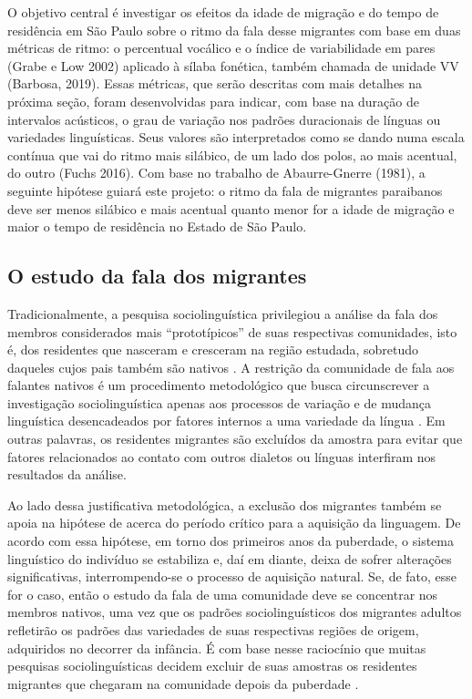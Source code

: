 \documentclass[
			a4paper,		%
			12pt,			%
			oneside,
			]{article}		%
\begin{document}
O objetivo central é investigar os efeitos da idade de migração e do tempo de 
residência em São Paulo sobre o ritmo da fala desse migrantes com base em duas métricas 
de ritmo: o percentual vocálico \citep{Ramus.etal1999} e o índice de variabilidade em 
pares (Grabe e Low 2002) aplicado à sílaba fonética, também chamada de unidade VV 
(Barbosa, 
2019). Essas métricas, que serão descritas com mais detalhes na próxima seção, foram 
desenvolvidas para indicar, com base na duração de intervalos acústicos, o grau de 
variação nos padrões duracionais de línguas ou variedades linguísticas. Seus valores são 
interpretados como se dando numa escala contínua que vai do ritmo mais silábico, de um 
lado dos polos, ao 	mais acentual, do outro (Fuchs 2016). Com base no trabalho de 
Abaurre-Gnerre (1981), a seguinte hipótese guiará este projeto: o ritmo da fala de 
migrantes paraibanos deve ser menos silábico e mais acentual quanto menor for a idade de 
migração e maior o tempo de residência no Estado de São Paulo.
	
		\subsection{O estudo da fala dos migrantes}
		
Tradicionalmente, a pesquisa sociolinguística privilegiou a análise da fala dos membros 
considerados mais “prototípicos” de suas respectivas comunidades, isto é, dos residentes 
que nasceram e cresceram na região estudada, sobretudo daqueles cujos pais também são 
nativos \citep{Britain2018, Oushiro2016, Milroy2002, Kerswill1993}. A restrição da 
comunidade de fala aos falantes nativos é um procedimento 
metodológico que busca circunscrever a investigação sociolinguística apenas aos processos 
de variação e de mudança linguística desencadeados por fatores internos a uma variedade 
da língua \citep[][p. 20]{Milroy2002, Labov2001}. Em outras palavras, os residentes 
migrantes são excluídos da amostra para 
evitar que fatores relacionados ao contato com outros dialetos ou línguas interfiram nos 
resultados da análise.

Ao lado dessa justificativa metodológica, a exclusão dos migrantes também se apoia na 
hipótese de \citet{Lenneberg1967} acerca do período crítico para a aquisição da 
linguagem. De acordo com essa hipótese, em torno dos primeiros anos da puberdade, o 
sistema linguístico do indivíduo se estabiliza e, daí em diante, deixa de sofrer 
alterações significativas, interrompendo-se o processo de aquisição natural. Se, de fato, 
esse for o caso, então o estudo da fala de uma comunidade deve se concentrar nos membros 
nativos, uma vez que os padrões sociolinguísticos dos migrantes adultos refletirão os 
padrões das variedades de suas respectivas regiões de origem, adquiridos no decorrer da 
infância. É com base nesse raciocínio que muitas pesquisas sociolinguísticas decidem 
excluir de suas amostras os residentes migrantes que chegaram na comunidade depois da 
puberdade \citep[p. ex.][p. 111]{Labov1966}.
\end{document}
